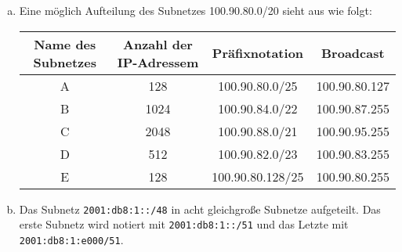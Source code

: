 

\pgfplotsset{compat=1.15}

\renewcommand{\arraystretch}{1.5}

\newcommand\tunderset[2]{\underset{\text{#1}}{\text{#2}}}

\date{Mittwoch 8.1.2020}


\maketitle
\thispagestyle{fancy}

\begin{enumerate}[a)]
	\item Eine möglich Aufteilung des Subnetzes 100.90.80.0/20 sieht aus wie folgt: \\
	\begin{tabular}{c|c|c|c}
				Name des Subnetzes & Anzahl der IP-Adressem & Präfixnotation   & Broadcast     \\ \hline
				A 				   & 128                    & 100.90.80.0/25   & 100.90.80.127 \\
				B 				   & 1024                   & 100.90.84.0/22   & 100.90.87.255 \\
				C 				   & 2048                   & 100.90.88.0/21   & 100.90.95.255 \\
				D 				   & 512                    & 100.90.82.0/23   & 100.90.83.255 \\
				E 				   & 128                    & 100.90.80.128/25 & 100.90.80.255
		\end{tabular}
	\item Das Subnetz \texttt{2001:db8:1::/48} in acht gleichgroße Subnetze aufgeteilt. Das erste Subnetz wird notiert mit 
	\texttt{2001:db8:1::/51} und das Letzte mit \texttt{2001:db8:1:e000/51}.
	
\end{enumerate}

